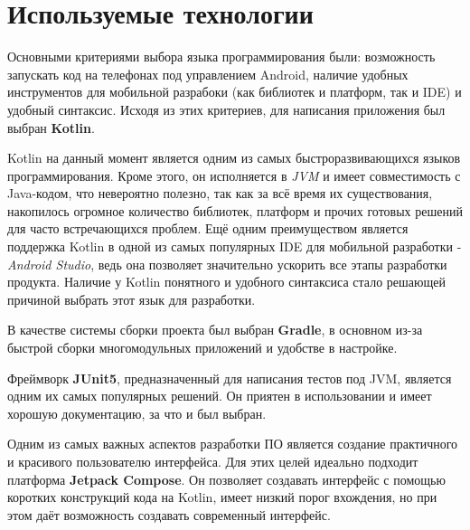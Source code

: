\section{Используемые технологии}
Основными критериями выбора языка программирования были: возможность запускать код на телефонах под управлением Android, наличие удобных инструментов для мобильной разрабоки (как библиотек и платформ, так и IDE) и удобный синтаксис. Исходя из этих критериев, для написания приложения был выбран \textbf{Kotlin}.\par
Kotlin на данный момент является одним из самых быстроразвивающихся языков программирования\cite{Github}. Кроме этого, он исполняется в \emph{JVM} и имеет совместимость с Java-кодом, что невероятно полезно, так как за всё время их существования, накопилось огромное количество библиотек, платформ и прочих готовых решений для часто встречающихся проблем. Ещё одним преимуществом является поддержка Kotlin в одной из самых популярных IDE для мобильной разработки - \emph{Android Studio}, ведь она позволяет значительно ускорить все этапы разработки продукта. Наличие у Kotlin понятного и удобного синтаксиса стало решающей причиной выбрать этот язык для разработки.\par
В качестве системы сборки проекта был выбран \textbf{Gradle}, в основном из-за быстрой сборки многомодульных приложений и удобстве в настройке.\par
Фреймворк \textbf{JUnit5}, предназначенный для написания тестов под JVM, является одним их самых популярных решений. Он приятен в использовании и имеет хорошую документацию, за что и был выбран.\par
Одним из самых важных аспектов разработки ПО является создание практичного и красивого пользователю интерфейса. Для этих целей идеально подходит платформа \textbf{Jetpack Compose}. Он позволяет создавать интерфейс с помощью коротких конструкций кода на Kotlin, имеет низкий порог вхождения, но при этом даёт возможность создавать современный интерфейс.
